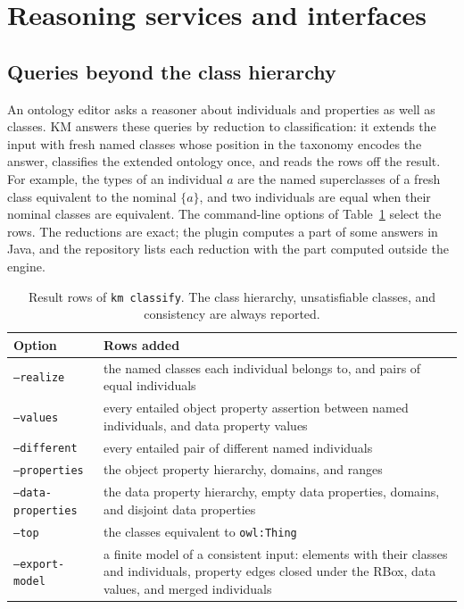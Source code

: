 \section{Reasoning services and interfaces}
\label{sec:services}

\subsection{Queries beyond the class hierarchy}

An ontology editor asks a reasoner about individuals and properties as well as
classes.  KM answers these queries by reduction to classification: it extends
the input with fresh named classes whose position in the taxonomy encodes the
answer, classifies the extended ontology once, and reads the rows off the
result.  For example, the types of an individual $a$ are the named superclasses
of a fresh class equivalent to the nominal $\{a\}$, and two individuals are
equal when their nominal classes are equivalent.  The command-line options of
Table~\ref{tab:rows} select the rows.  The reductions are exact; the plugin
computes a part of some answers in Java, and the repository lists each
reduction with the part computed outside the engine.

\begin{table}[t]
\centering
\small
\caption{Result rows of \texttt{km classify}.  The class hierarchy,
unsatisfiable classes, and consistency are always reported.}
\label{tab:rows}
\begin{tabularx}{\linewidth}{@{}lX@{}}
\toprule
Option & Rows added \\
\midrule
\texttt{--realize} & the named classes each individual belongs to, and pairs of equal individuals \\
\texttt{--values} & every entailed object property assertion between named individuals, and data property values \\
\texttt{--different} & every entailed pair of different named individuals \\
\texttt{--properties} & the object property hierarchy, domains, and ranges \\
\texttt{--data-properties} & the data property hierarchy, empty data properties, domains, and disjoint data properties \\
\texttt{--top} & the classes equivalent to \texttt{owl:Thing} \\
\texttt{--export-model} & a finite model of a consistent input: elements with their classes and individuals, property edges closed under the RBox, data values, and merged individuals \\
\bottomrule
\end{tabularx}
\end{table}

